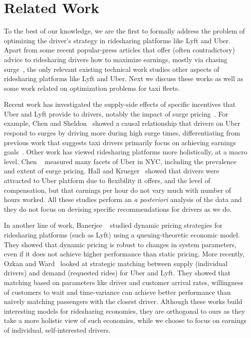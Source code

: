 
\section{Related Work}
\label{sec:related_work}

To the best of our knowledge, we are the first to formally address the problem of optimizing
the driver's strategy in ridesharing platforms like Lyft and Uber. 
Apart from 
some recent popular-press articles that 
offer (often contradictory) advice to ridesharing drivers how to maximize earnings, mostly via chasing surge~\cite{dont,tips}, 
the only relevant existing technical work 
studies other aspects of ridesharing platforms like Lyft and Uber. 
Next we discuss these works as well as some work related on optimization problems
for taxi fleets.


Recent work has investigated the supply-side effects of specific incentives that Uber and Lyft provide to drivers, notably the impact of surge pricing~\cite{slaves}.  For example, Chen and Sheldon~\cite{chen2016dynamic} showed 
a causal relationship that drivers on Uber respond to surges by driving more during high surge times,  differentiating from previous work that suggests taxi drivers primarily focus on achieving earnings goals~\cite{camerer1997labor}. 
Other work has viewed ridesharing platforms more holistically, at a macro level.
Chen {\etal}~\cite{chen2015peeking} measured many facets of Uber in NYC, including the prevalence and extent 
  of surge pricing.
Hall and Krueger~\cite{hall2016analysis} showed that drivers were attracted to Uber platform due to flexibility it offers, 
and the level of compensation, but that earnings per hour do not vary much with number of hours worked. 
All these studies perform an {\em a posteriori} analysis of the data
and they do not focus on devising specific recommendations for drivers as we do.


 In another line of work, Banerjee {\etal}~\cite{banerjee2015pricing} studied  
 dynamic
pricing strategies for ridesharing platforms (such as Lyft) using a 
queuing-theoretic economic model. 
They showed that dynamic pricing is robust to changes in system parameters, even if it does not 
  achieve higher performance than static pricing.  
More recently, Ozkan and Ward~\cite{ozkan2016dynamic} looked at strategic matching between supply (individual drivers) 
  and demand (requested rides) for Uber and Lyft.
They showed that matching based on parameters like driver and customer arrival rates, 
willingness of customers to wait and time-variance can achieve better performance than naively matching 
passengers with the closest driver. 
Although these works build interesting models for ridesharing economies, they are
orthogonal to ours as they take a more holistic view of such economies, while we choose to focus 
 on earnings of individual, self-interested drivers.




